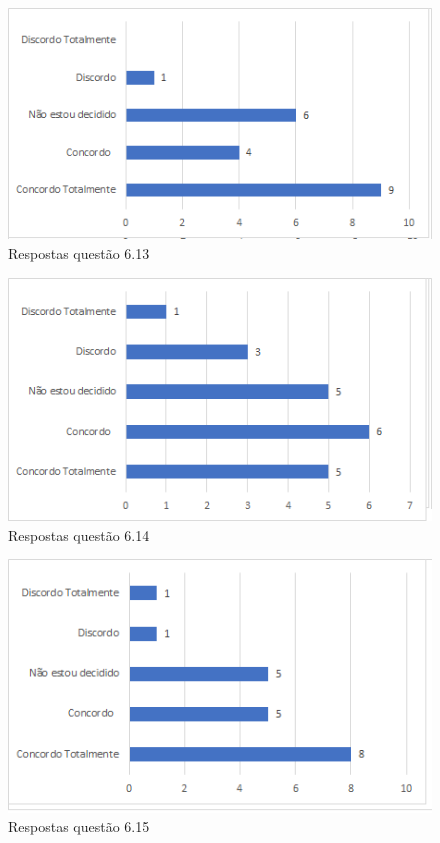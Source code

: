 \begin{figure}[!t]
\centering
\includegraphics[scale=0.7]{figuras das questoes/6.13.png}
\caption{Respostas questão 6.13}
\end{figure}

\begin{figure}[!t]
\centering
\includegraphics[scale=0.7]{figuras das questoes/6.14.png}
\caption{Respostas questão 6.14}
\end{figure}

\begin{figure}[!t]
\centering
\includegraphics[scale=0.7]{figuras das questoes/6.15.png}
\caption{Respostas questão 6.15}
\end{figure}

